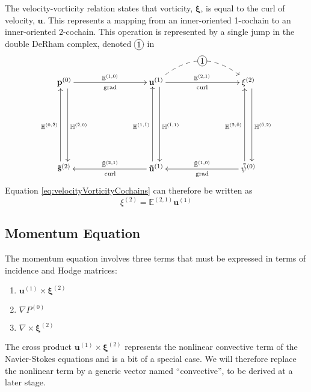 The velocity-vorticity relation states that vorticity, $\mathbf{\xi}$, is equal to the curl of velocity, $\mathbf{u}$. This represents a mapping from an inner-oriented 1-cochain to an inner-oriented 2-cochain. This operation is represented by a single jump in the double DeRham complex, denoted $\xymatrix{*+[o][F-]{1}}$ in
\begin{equation}
    \begin{gathered}
        \xymatrix@=20ex{
            \mathbf{p}^{(0)} \ar[r]^{\mathbb{E}^{(1,0)}}_{\text{grad}} \ar@<1ex>[d]^{\mathbb{H}^{(\tilde{2},0)}} & \mathbf{u}^{(1)} \ar[r]^{\mathbb{E}^{(2,1)}}_{\text{curl}} \ar @/^6ex/ @{-->} [r]|-*+[o][F-]{1} \ar@<1ex>[d]^{\mathbb{H}^{(\tilde{1},1)}} & \mathbf{\xi}^{(2)} \ar@<1ex>[d]^{\mathbb{H}^{(\tilde{0},2)}} \\
            \mathbf{\tilde{s}}^{(2)} \ar@<1ex>[u]^{\mathbb{H}^{(0,\tilde{2})}} & \mathbf{\tilde{u}}^{(1)} \ar[l]_{\tilde{\mathbb{E}}^{(2, 1)}}^{\text{curl}} \ar@<1ex>[u]^{\mathbb{H}^{(1,\tilde{1})}} & \mathbf{\tilde{\psi}}^{(0)} \ar[l]_{\tilde{\mathbb{E}}^{(1,0)}}^{\text{grad}} \ar@<1ex>[u]^{\mathbb{H}^{(2,\tilde{0})}}
        }
    \end{gathered}
    \label{eq:DeRhamVelocityVorticity}
\end{equation}
Equation \ref{eq:velocityVorticityCochains} can therefore be written as
\begin{equation}
    \xi^{(2)} = \mathbb{E}^{(2,1)} \mathbf{u}^{(1)}
\end{equation}

\subsection{Momentum Equation}

The momentum equation involves three terms that must be expressed in terms of incidence and Hodge matrices:
\begin{enumerate}
    \item $\mathbf{u}^{(1)} \times \mathbf{\xi}^{(2)}$
    \item $\nabla P^{(0)}$
    \item $\nabla \times \mathbf{\xi}^{(2)}$
\end{enumerate}


The cross product $\mathbf{u}^{(1)} \times \mathbf{\xi}^{(2)}$ represents the nonlinear convective term of the Navier-Stokes equations and is a bit of a special case. We will therefore replace the nonlinear term by a generic vector named ``convective'', to be derived at a later stage.

